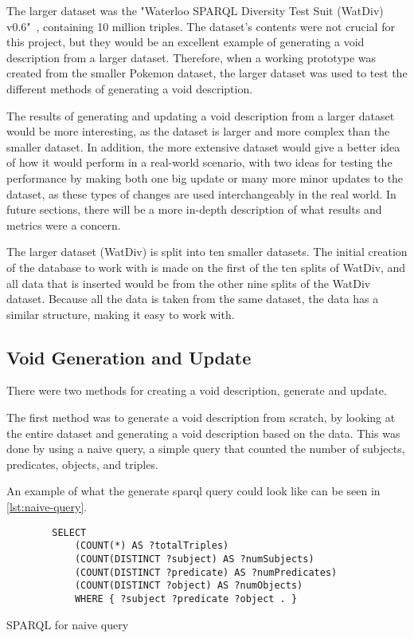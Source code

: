 The larger dataset was the "Waterloo SPARQL Diversity Test Suit (WatDiv) v0.6"~\cite{WatDiv}, containing 10 million triples. The dataset's contents were not crucial for this project, but they would be an excellent example of generating a \gls{void} description from a larger dataset. Therefore, when a working prototype was created from the smaller Pokemon dataset, the larger dataset was used to test the different methods of generating a \gls{void} description.

The results of generating and updating a \gls{void} description from a larger dataset would be more interesting, as the dataset is larger and more complex than the smaller dataset. In addition, the more extensive dataset would give a better idea of how it would perform in a real-world scenario, with two ideas for testing the performance by making both one big update or many more minor updates to the dataset, as these types of changes are used interchangeably in the real world. In future sections, there will be a more in-depth description of what results and metrics were a concern.

The larger dataset (WatDiv) is split into ten smaller datasets. The initial creation of the database to work with is made on the first of the ten splits of WatDiv, and all data that is inserted would be from the other nine splits of the WatDiv dataset. Because all the data is taken from the same dataset, the data has a similar structure, making it easy to work with.

\subsection{Void Generation and Update}\label{sec:void}
There were two methods for creating a \gls{void} description, generate and update.

The first method was to generate a \gls{void} description from scratch, by looking at the entire dataset and generating a \gls{void} description based on the data. This was done by using a naive query, a simple query that counted the number of subjects, predicates, objects, and triples.

An example of what the generate \gls{sparql} query could look like can be seen in \autoref{lst:naive-query}.
\begin{listing}[htb!]
    \begin{verbatim}          
        SELECT
            (COUNT(*) AS ?totalTriples)
            (COUNT(DISTINCT ?subject) AS ?numSubjects)
            (COUNT(DISTINCT ?predicate) AS ?numPredicates)
            (COUNT(DISTINCT ?object) AS ?numObjects)
            WHERE { ?subject ?predicate ?object . }
    \end{verbatim}
    \caption{SPARQL for naive query}
    \label{lst:naive-query}
\end{listing}

